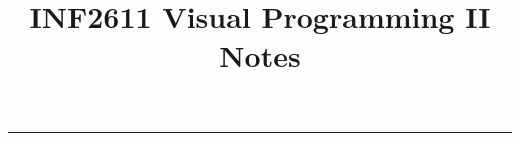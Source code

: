 \documentclass[11pt, a4paper]{book}
\title{INF2611 Visual Programming II Notes}
\author{ }
\begin{document}
	\begin{titlepage}
		\maketitle
	\end{titlepage}
	\clearpage\begingroup\pagestyle{empty}\cleardoublepage\endgroup
	\tableofcontents
	\noindent\rule{\textwidth}{0.4pt}
\end{document}
